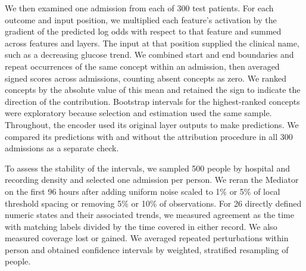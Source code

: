 We then examined one admission from each of 300 test patients. For each outcome and input position, we multiplied each feature's activation by the gradient of the predicted log odds with respect to that feature and summed across features and layers. The input at that position supplied the clinical name, such as a decreasing glucose trend. We combined start and end boundaries and repeat occurrences of the same concept within an admission, then averaged signed scores across admissions, counting absent concepts as zero. We ranked concepts by the absolute value of this mean and retained the sign to indicate the direction of the contribution. Bootstrap intervals for the highest-ranked concepts were exploratory because selection and estimation used the same sample. Throughout, the encoder used its original layer outputs to make predictions. We compared its predictions with and without the attribution procedure in all 300 admissions as a separate check.

To assess the stability of the intervals, we sampled 500 people by hospital and recording density and selected one admission per person. We reran the Mediator on the first 96 hours after adding uniform noise scaled to 1\% or 5\% of local threshold spacing or removing 5\% or 10\% of observations. For 26 directly defined numeric states and their associated trends, we measured agreement as the time with matching labels divided by the time covered in either record. We also measured coverage lost or gained. We averaged repeated perturbations within person and obtained confidence intervals by weighted, stratified resampling of people.
